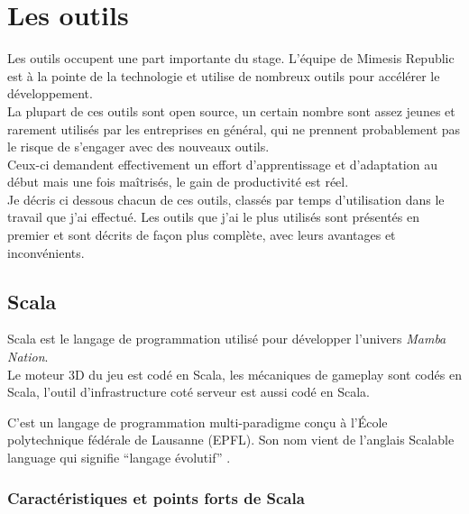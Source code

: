 \chapter{Les outils}       
Les outils occupent une part importante du stage.
L'équipe de Mimesis Republic est à la pointe de la technologie et utilise de
nombreux outils pour accélérer le développement.\\
La plupart de ces outils sont open source, un certain nombre sont assez jeunes
et rarement utilisés par les entreprises en général, qui ne prennent
probablement pas le risque de s'engager avec des nouveaux outils.\\ 
Ceux-ci demandent effectivement un effort d'apprentissage et d'adaptation au
début mais une fois maîtrisés, le gain de productivité est réel.\\

Je décris ci dessous chacun de ces outils,
classés par temps d'utilisation dans le travail que j'ai effectué.
Les outils que j'ai le plus utilisés sont présentés en premier et sont décrits
de façon plus complète, avec leurs avantages et inconvénients.

\section{Scala}
Scala est le langage de programmation utilisé pour développer l'univers \textit{Mamba
  Nation}.\\
Le moteur 3D du jeu est codé en Scala, les mécaniques de gameplay sont codés en
Scala, l'outil d'infrastructure coté serveur est aussi codé en Scala.

C'est un langage de programmation multi-paradigme conçu à l'École polytechnique
fédérale de Lausanne (EPFL).
Son nom vient de l'anglais Scalable language qui signifie  ``langage évolutif''
. 

\subsection{Caractéristiques et points forts de Scala}

